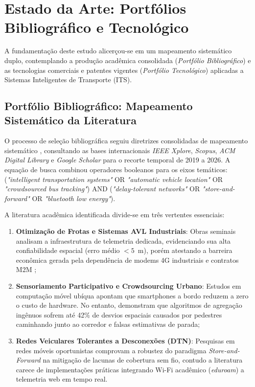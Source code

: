 \documentclass[lettersize,journal]{IEEEtran}
\begin{document}
\section{Estado da Arte: Portfólios Bibliográfico e Tecnológico}
A fundamentação deste estudo alicerçou-se em um mapeamento sistemático duplo, contemplando a produção acadêmica consolidada (\textit{Portfólio Bibliográfico}) e as tecnologias comerciais e patentes vigentes (\textit{Portfólio Tecnológico}) aplicadas a Sistemas Inteligentes de Transporte (ITS).

\subsection{Portfólio Bibliográfico: Mapeamento Sistemático da Literatura}
O processo de seleção bibliográfica seguiu diretrizes consolidadas de mapeamento sistemático \cite{ref_slr_kitchenham}, consultando as bases internacionais \textit{IEEE Xplore}, \textit{Scopus}, \textit{ACM Digital Library} e \textit{Google Scholar} para o recorte temporal de 2019 a 2026. A equação de busca combinou operadores booleanos para os eixos temáticos: (\textit{"intelligent transportation systems"} OR \textit{"automatic vehicle location"} OR \textit{"crowdsourced bus tracking"}) AND (\textit{"delay-tolerant networks"} OR \textit{"store-and-forward"} OR \textit{"bluetooth low energy"}).

A literatura acadêmica identificada divide-se em três vertentes essenciais:
\begin{enumerate}
    \item \textbf{Otimização de Frotas e Sistemas AVL Industriais}: Obras seminais \cite{ref_its_smart,ref_avl_standard} analisam a infraestrutura de telemetria dedicada, evidenciando sua alta confiabilidade espacial (erro médio $< 5$~m), porém atestando a barreira econômica gerada pela dependência de modems 4G industriais e contratos M2M \cite{ref_avl_cost};
    \item \textbf{Sensoriamento Participativo e Crowdsourcing Urbano}: Estudos em computação móvel ubíqua \cite{ref_crowd_sensing,ref_crowd_transit,ref_moovit_study} apontam que smartphones a bordo reduzem a zero o custo de hardware. No entanto, demonstram que algoritmos de agregação ingênuos sofrem até 42\% de desvios espaciais causados por pedestres caminhando junto ao corredor e falsas estimativas de parada;
    \item \textbf{Redes Veiculares Tolerantes a Desconexões (DTN)}: Pesquisas em redes móveis oportunistas \cite{ref_dtn_survey,ref_vanet_dtn} comprovam a robustez do paradigma \textit{Store-and-Forward} na mitigação de lacunas de cobertura sem fio, contudo a literatura carece de implementações práticas integrando Wi-Fi acadêmico (\textit{eduroam}) a telemetria web em tempo real.
\end{enumerate}
\end{document}
